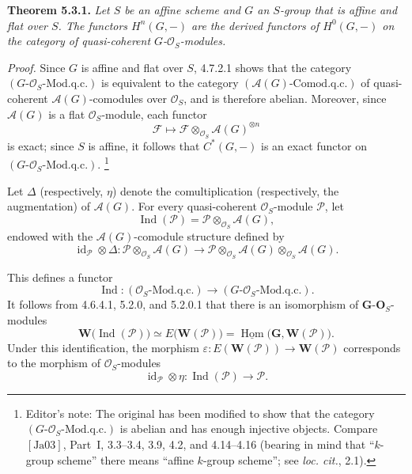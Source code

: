 \medskip
\noindent\textbf{Theorem 5.3.1.}
\textit{Let \(S\) be an affine scheme and \(G\) an \(S\)-group that is
affine and flat over \(S\). The functors \(H^n(G,-)\) are the derived
functors of \(H^0(G,-)\) on the category of quasi-coherent
\(G\)-\(\mathscr O_S\)-modules.}

\medskip
\noindent\textit{Proof.}
Since \(G\) is affine and flat over \(S\), 4.7.2.1 shows that the category
\((G\text{-}\mathscr O_S\text{-Mod.q.c.})\) is equivalent to the category
\((\mathscr A(G)\text{-Comod.q.c.})\) of quasi-coherent
\(\mathscr A(G)\)-comodules over \(\mathscr O_S\), and is therefore
abelian. Moreover, since \(\mathscr A(G)\) is a flat
\(\mathscr O_S\)-module, each functor
\[
  \mathscr F\longmapsto
    \mathscr F\otimes_{\mathscr O_S}\mathscr A(G)^{\otimes n}
\]
is exact; since \(S\) is affine, it follows that \(C^*(G,-)\) is an exact
functor on \((G\text{-}\mathscr O_S\text{-Mod.q.c.})\).
\footnote{Editor's note: The original has been modified to show that the
category \((G\text{-}\mathscr O_S\text{-Mod.q.c.})\) is abelian and has
enough injective objects. Compare \([\mathrm{Ja}03]\), Part~I,
3.3--3.4, 3.9, 4.2, and 4.14--4.16 (bearing in mind that ``\(k\)-group
scheme'' there means ``affine \(k\)-group scheme''; see \emph{loc. cit.},
2.1).}

Let \(\Delta\) (respectively, \(\eta\)) denote the comultiplication
(respectively, the augmentation) of \(\mathscr A(G)\). For every
quasi-coherent \(\mathscr O_S\)-module \(\mathscr P\), let
\[
  \operatorname{Ind}(\mathscr P)
    =\mathscr P\otimes_{\mathscr O_S}\mathscr A(G),
\]
endowed with the \(\mathscr A(G)\)-comodule structure defined by
\[
  \operatorname{id}_{\mathscr P}\otimes\Delta:
  \mathscr P\otimes_{\mathscr O_S}\mathscr A(G)
    \longrightarrow
  \mathscr P\otimes_{\mathscr O_S}\mathscr A(G)
    \otimes_{\mathscr O_S}\mathscr A(G).
\]

This defines a functor
\[
  \operatorname{Ind}:(\mathscr O_S\text{-Mod.q.c.})
    \longrightarrow(G\text{-}\mathscr O_S\text{-Mod.q.c.}).
\]
It follows from 4.6.4.1, 5.2.0, and 5.2.0.1 that there is an isomorphism of
\(\mathbf G\)-\(\mathbf O_S\)-modules
\[
  \tag{*}
  \mathbf W\bigl(\operatorname{Ind}(\mathscr P)\bigr)
    \simeq E\bigl(\mathbf W(\mathscr P)\bigr)
    =\underline{\operatorname{Hom}}
       \bigl(\mathbf G,\mathbf W(\mathscr P)\bigr).
\]
Under this identification, the morphism
\(\varepsilon:E(\mathbf W(\mathscr P))\to\mathbf W(\mathscr P)\)
corresponds to the morphism of \(\mathscr O_S\)-modules
\[
  \operatorname{id}_{\mathscr P}\otimes\eta:
    \operatorname{Ind}(\mathscr P)\longrightarrow\mathscr P.
\]

